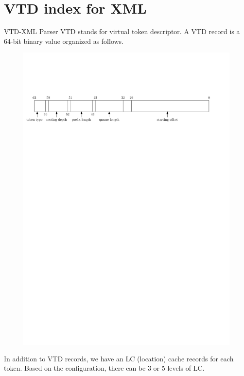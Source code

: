 \documentclass{beamer}
\begin{document}
\section{VTD index for XML}
\begin{frame}{VTD-XML Parser}
    VTD stands for virtual token descriptor. A VTD record is a 64-bit binary value organized as follows.

    \begin{figure}[htbp]
        \centering
        \includegraphics[width=\linewidth]{res/vtd-record-schematic.pdf}
    \end{figure}

    In addition to VTD records, we have an LC (location) cache records for each token. Based on the configuration, there can be 3 or 5 levels of LC.


\end{frame}
\end{document}
